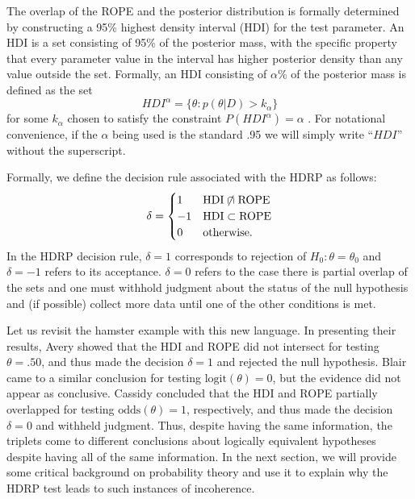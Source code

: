 \documentclass[man]{apa}
\newcommand{\hdr}{HDRP}
\newcommand{\oddss}{\text{odds}}
\newcommand{\logit}{\text{logit}}
\begin{document}
The overlap of the ROPE and the posterior distribution is formally determined by constructing a 95\% highest density interval (HDI) for the test parameter. An HDI is a set consisting of 95\% of the posterior mass, with the specific property that every parameter value in the interval has higher posterior density than any value outside the set. Formally, an HDI consisting of $\alpha$\% of the posterior mass is defined as the set  
\begin{equation}
    HDI^\alpha = \{\theta:p(\theta|D)>k_\alpha\}\label{eq:hdi}
\end{equation}
for some $k_\alpha$ chosen to satisfy the constraint $P(HDI^\alpha)=\alpha$ \cite{druilhet2007}. For notational convenience, if the $\alpha$ being used is the standard .95 we will simply write ``$HDI$'' without the superscript. 

Formally, we define the decision rule associated with the \hdr{} as follows:
\begin{equation*}
    \delta =
    \begin{cases}
    1 & \text{HDI} \centernot\cap \text{ROPE} \\ %
    -1 & \text{HDI} \subset \text{ROPE}\\
    0 & \text{otherwise}.
    \end{cases}
\end{equation*}
In the \hdr{} decision rule, $\delta=1$ corresponds to rejection of $H_0:\theta=\theta_0$ and $\delta=-1$ refers to its acceptance. $\delta=0$ refers to the case there is partial overlap of the sets and one must withhold judgment about the status of the null hypothesis and (if possible) collect more data until one of the other conditions is met. 

Let us revisit the hamster example with this new language. In presenting their results, Avery showed that the HDI and ROPE did not intersect for testing $\theta=.50$, and thus made the decision $\delta=1$ and rejected the null hypothesis. Blair came to a similar conclusion for testing $\logit(\theta)=0$, but the evidence did not appear as conclusive. Cassidy concluded that the HDI and ROPE partially overlapped for testing $\oddss(\theta)=1$, respectively, and thus made the decision $\delta=0$ and withheld judgment. Thus, despite having the same information, the triplets come to different conclusions about logically equivalent hypotheses despite having all of the same information. In the next section, we will provide some critical background on probability theory and use it to explain why the \hdr{} test leads to such instances of incoherence.
\end{document}
